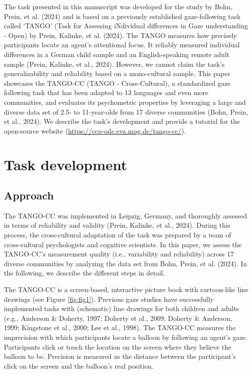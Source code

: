 \documentclass[
  man,floatsintext]{apa7}
\begin{document}
The task presented in this manuscript was developed for the study by Bohn, Prein, et al. (2024) and is based on a previously established gaze-following task called `TANGO' (Task for Assessing iNdividual differences in Gaze understanding - Open) by Prein, Kalinke, et al. (2024).
The TANGO measures how precisely participants locate an agent's attentional focus.
It reliably measured individual differences in a German child sample and an English-speaking remote adult sample (Prein, Kalinke, et al., 2024).
However, we cannot claim the task's generalizability and reliability based on a mono-cultural sample.
This paper showcases the TANGO-CC (TANGO - Cross-Cultural), a standardized gaze following task that has been adapted to 13 languages and even more communities, and evaluates its psychometric properties by leveraging a large and diverse data set of 2.5- to 11-year-olds from 17 diverse communities (Bohn, Prein, et al., 2024).
We describe the task's development and provide a tutorial for the open-source website (\url{https://ccp-odc.eva.mpg.de/tango-cc/}).

\section{Task development}\label{task-development}

\subsection{Approach}\label{approach}

The TANGO-CC was implemented in Leipzig, Germany, and thoroughly assessed in terms of reliability and validity (Prein, Kalinke, et al., 2024).
During this process, the cross-cultural adaptation of the task was prepared by a team of cross-cultural psychologists and cognitive scientists.
In this paper, we assess the TANGO-CC's measurement quality (i.e., variability and reliability) across 17 diverse communities by analyzing the data set from Bohn, Prein, et al. (2024).
In the following, we describe the different steps in detail.

The TANGO-CC is a screen-based, interactive picture book with cartoon-like line drawings (see Figure \ref{fig:fig1}). Previous gaze studies have successfully implemented tasks with (schematic) line drawings for both children and adults (e.g., Anderson \& Doherty, 1997; Doherty et al., 2009; Doherty \& Anderson, 1999; Kingstone et al., 2000; Lee et al., 1998).
The TANGO-CC measures the imprecision with which participants locate a balloon by following an agent's gaze.
Participants click or touch the location on the screen where they believe the balloon to be.
Precision is measured as the distance between the participant's click on the screen and the balloon's real position.
\end{document}
